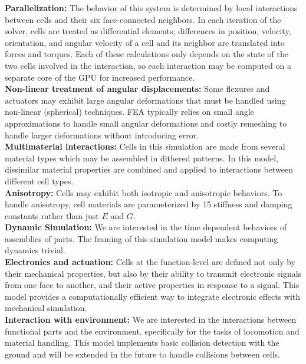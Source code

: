 {\textbf{Parallelization:} The behavior of this system is determined by local interactions between cells and their six face-connected neighbors.  In each iteration of the solver, cells are treated as differential elements; differences in position, velocity, orientation, and angular velocity of a cell and its neighbor are translated into forces and torques.  Each of these calculations only depends on the state of the two cells involved in the interaction, so each interaction may be computed on a separate core of the GPU for increased performance.\\

\textbf{Non-linear treatment of angular displacements:} Some flexures and actuators may exhibit large angular deformations that must be handled using non-linear (spherical) techniques.  FEA typically relies on small angle approximations to handle small angular deformations and costly remeshing to handle larger deformations without introducing error.\\

\textbf{Multimaterial interactions:} Cells in this simulation are made from several material types which may be assembled in dithered patterns.  In this model, dissimilar material properties are combined and applied to interactions between different cell types.\\

\textbf{Anisotropy:} Cells may exhibit both isotropic and anisotropic behaviors.  To handle anisotropy, cell materials are parameterized by 15 stiffness and damping constants rather than just $E$ and $G$.\\

\textbf{Dynamic Simulation:} We are interested in the time dependent behaviors of assemblies of parts.  The framing of this simulation model makes computing dynamics trivial.\\

\textbf{Electronics and actuation:} Cells at the function-level are defined not only by their mechanical properties, but also by their ability to transmit electronic signals from one face to another, and their active properties in response to a signal.  This model provides a computationally efficient way to integrate electronic effects with mechanical simulation. \\

\textbf{Interaction with environment:}  We are interested in the interactions between functional parts and the environment, specifically for the tasks of locomotion and material handling.  This model implements basic collision detection with the ground and will be extended in the future to handle collisions between cells.\\

}
